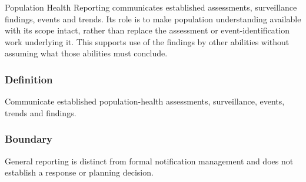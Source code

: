 Population Health Reporting communicates established assessments, surveillance findings, events and trends. Its role is to make population understanding available with its scope intact, rather than replace the assessment or event-identification work underlying it. This supports use of the findings by other abilities without assuming what those abilities must conclude.

\subsubsection*{Definition}

Communicate established population-health assessments, surveillance, events, trends and findings.

\subsubsection*{Boundary}

General reporting is distinct from formal notification management and does not establish a response or planning decision.


